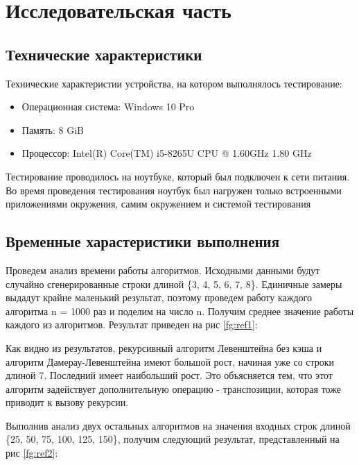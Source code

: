\chapter{Исследовательская часть}
\section{Технические характеристики}
Технические характеристии устройства, на котором выполнялось тестирование:
\begin{itemize}
	\item Операционная система: Windows 10 Pro
	\item Память: 8 GiB
	\item Процессор: Intel(R) Core(TM) i5-8265U CPU @ 1.60GHz   1.80 GHz
\end{itemize}
Тестирование проводилось на ноутбуке, который был подключен к сети питания. Во время проведения тестирования ноутбук был нагружен только встроенными приложениями окружения, самим окружением и системой тестирования

\section{Временные харастеристики выполнения}
Проведем анализ времени работы алгоритмов. Исходными данными будут случайно сгенерированные строки длиной \{3, 4, 5, 6, 7, 8\}. Единичные замеры выдадут крайне маленький результат, поэтому  проведем работу каждого алгоритма n = 1000 раз и поделим на число n. Получим среднее значение работы каждого из алгоритмов. Результат приведен на рис \ref{fg:ref1}:

\begin{figure}[H]
\end{figure} 

Как видно из результатов, рекурсивный алгоритм Левенштейна без кэша и алгоритм Дамерау-Левенштейна имеют большой рост, начиная уже со строки длиной 7. Последний имеет наибольший рост. Это объясняется тем, что этот алгоритм задействует дополнительную операцию - транспозиции, которая тоже приводит к вызову рекурсии.

Выполнив анализ двух остальных алгоритмов на значения входных строк длиной \{25, 50, 75, 100, 125, 150\}, получим следующий результат, представленный на рис  \ref{fg:ref2}:
\begin{figure}[H]
\end{figure} 

